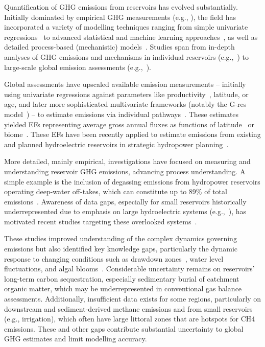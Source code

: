 \documentclass[final,1p,times]{elsarticle}
\begin{document}
Quantification of \ac{GHG} emissions from reservoirs has evolved substantially. Initially dominated by empirical \ac{GHG} measurements (e.g., \cite{Louis2000, dosSantos2006, GalyLacaux2006}), the field has incorporated a variety of modelling techniques ranging from simple univariate regressions~\cite{Barros2011, Huttunen2006, unesco_iha_ghg_2010, ghg_risk_tool_manual} to advanced statistical and machine learning approaches~\cite{Beaulieu2020b, WANG2025123441}, as well as detailed process-based (mechanistic) models~\cite{Berger2014, Lomov2024, Delwiche2022, Wu2022, Zhuang2023, Tan2024, SHI2025}. 
Studies span from in-depth analyses of \ac{GHG} emissions and mechanisms in individual reservoirs (e.g.,~\cite{gruca2011, Berger2014}) to large-scale global emission assessments (e.g.,~\cite{Louis2000, Deemer2016, Harrison2021, Soued2022}).

Global assessments have upscaled available emission measurements -- initially using univariate regressions against parameters like productivity~\cite{Deemer2016}, latitude, or age, and later more sophisticated multivariate frameworks (notably the G-res model~\cite{Prairie2017b, Prairie2021}) -- to estimate emissions via individual pathways~\cite{Harrison2021, Soued2022}. 
These estimates yielded \acfp{EF} representing average gross annual fluxes as functions of latitude~\cite{Harrison2021} or biome~\cite{Soued2022}. 
These \acp{EF} have been recently applied to estimate emissions from existing and planned hydroelectric reservoirs in strategic hydropower planning~\cite{Almeida2019, Carlino2024, Tangi2024}.

More detailed, mainly empirical, investigations have focused on measuring and understanding reservoir \ac{GHG} emissions, advancing process understanding. 
A simple example is the inclusion of degassing emissions from hydropower reservoirs operating deep-water off-takes, which can constitute up to 89\% of total emissions~\cite{Soued2020exp}. 
Awareness of data gaps, especially for small reservoirs historically underrepresented due to emphasis on large hydroelectric systems (e.g.,~\cite{Barros2011, GalyLacaux2006, Delwiche2022, Tremblay2004}), has motivated recent studies targeting these overlooked systems~\cite{Naslund2024}.

These studies improved understanding of the complex dynamics governing emissions but also identified key knowledge gaps, particularly the dynamic response to changing conditions such as drawdown zones~\cite{Barbosa2024}, water level fluctuations, and algal blooms~\cite{Liao2024-ct}. 
Considerable uncertainty remains on reservoirs' long-term carbon sequestration, especially sedimentary burial of catchment organic matter, which may be underrepresented in conventional gas balance assessments. 
Additionally, insufficient data exists for some regions, particularly on downstream and sediment-derived methane emissions and from small reservoirs (e.g., irrigation), which often have large littoral zones that are hotspots for \ac{CH4} emissions. 
These and other gaps contribute substantial uncertainty to global \ac{GHG} estimates and limit modelling accuracy.
\end{document}
